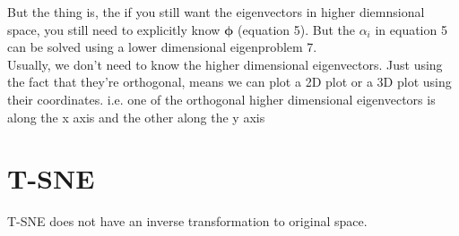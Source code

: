 \documentclass{article}
\begin{document}
But the thing is, the if you still want the eigenvectors in higher diemnsional space, you still need to explicitly know $\pmb{\phi}$ (equation 5). But the $\alpha_i$ in equation 5 can be solved using a lower dimensional eigenproblem 7. \\

Usually, we don't need to know the higher dimensional eigenvectors. Just using the fact that they're orthogonal, means we can plot a 2D plot or a 3D plot using their coordinates. i.e. one of the orthogonal higher dimensional eigenvectors is along the x axis and the other along the y axis

\section{T-SNE}
T-SNE does not have an inverse transformation to original space.
\end{document}
